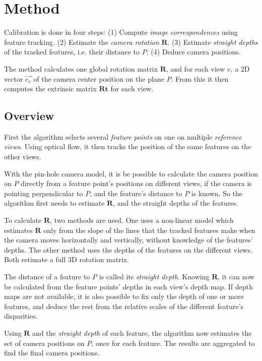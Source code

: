 \documentclass{scrreprt}
\newcommand{\matr}[1]{\mathbf{#1}}
\begin{document}
\chapter{Method}
Calibration is done in four steps: (1) Compute \emph{image correspondences} using feature tracking. (2) Estimate the \emph{camera rotation} $\matr{R}$. (3) Estimate \emph{straight depths} of the tracked features, i.e. their distance to $P$. (4) Deduce camera positions.

The method calculates one global rotation matrix $\matr{R}$, and for each view $v$, a 2D vector $\vec{c_v}$ of the camera center position on the plane $P$. From this it then computes the extrinsic matrix $\matr{Rt}$ for each view.

\section{Overview}
First the algorithm selects several \emph{feature points} on one on multiple \emph{reference views}. Using optical flow, it then tracks the position of the same features on the other views.

With the pin-hole camera model, it is be possible to calculate the camera position on $P$ directly from a feature point's positions on different views, if the camera is pointing perpendicular to $P$, and the feature's distance to $P$ is known. So the algorithm first needs to estimate $\matr{R}$, and the straight depths of the features.

To calculate $\matr{R}$, two methods are used. One uses a non-linear model which estimates $\matr{R}$ only from the slope of the lines that the tracked features make when the camera moves horizontally and vertically, without knowledge of the features' depths. The other method uses the depths of the features on the different views. Both estimate a full 3D rotation matrix.

The distance of a feature to $P$ is called its \emph{straight depth}. Knowing $\matr{R}$, it can now be calculated from the feature points' depths in each view's depth map. If depth maps are not available, it is also possible to fix only the depth of one or more features, and deduce the rest from the relative scales of the different feature's disparities. 

Using $\matr{R}$ and the \emph{straight depth} of each feature, the algorithm now estimates the set of camera positions on $P$, once for each feature. The results are aggregated to find the final camera positions.
\end{document}
